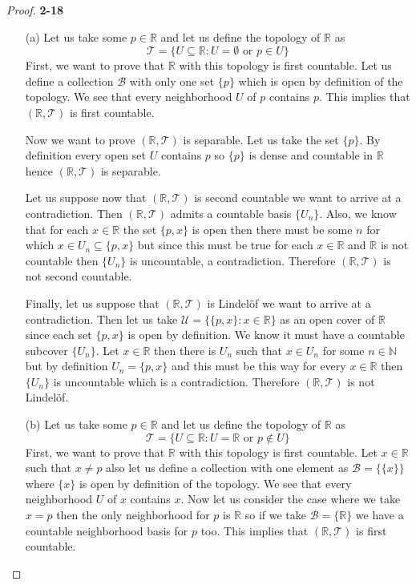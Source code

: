 \documentclass[11pt]{article}
\newcommand{\N}{\mathbb{N}}
\newcommand{\R}{\mathbb{R}}
\theoremstyle{definition}
\begin{document}
\cleardoublepage
\begin{proof}{\textbf{2-18}}
\begin{itemize}
    \item [(a)] Let us take some $p \in \R$ and let us define the topology of
    $\R$ as
    $$\mathcal{T} = \{U \subseteq \R: U= \emptyset \text{ or } p \in U\}$$
    First, we want to prove that $\R$ with this topology is first countable.
    Let us define a collection $\mathcal{B}$ with only one set $\{p\}$ which
    is open by definition of the topology. We see that every neighborhood $U$
    of $p$ contains $p$.
    This implies that $(\R, \mathcal{T})$ is first countable.

    Now we want to prove $(\R, \mathcal{T})$ is separable. Let us take the
    set $\{p\}$. By definition every open set $U$ contains $p$ so $\{p\}$ is
    dense and countable in $\R$ hence $(\R, \mathcal{T})$ is separable.

    Let us suppose now that $(\R, \mathcal{T})$ is second countable we want to
    arrive at a contradiction. Then $(\R, \mathcal{T})$ admits a countable
    basis $\{U_n\}$. Also, we know that for each $x \in \R$ the set $\{p,x\}$
    is open then there must be some $n$ for which $x \in U_n \subseteq \{p,x\}$
    but since this must be true for each $x \in \R$ and $\R$ is not countable
    then $\{U_n\}$ is uncountable, a contradiction.
    Therefore $(\R, \mathcal{T})$ is not second countable.

    Finally, let us suppose that $(\R, \mathcal{T})$ is Lindelöf we want to
    arrive at a contradiction. Then let us take 
    $\mathcal{U} = \{\{p,x\}: x \in \R\}$ as an open cover of $\R$ since each
    set $\{p,x\}$ is open by definition. We know it must have a countable
    subcover $\{U_n\}$. Let $x \in \R$ then there is $U_n$ such that
    $x \in U_n$ for some $n \in \N$ but by definition $U_n = \{p, x\}$
    and this must be this way for every $x \in \R$ then $\{U_n\}$
    is uncountable which is a contradiction.
    Therefore $(\R, \mathcal{T})$ is not Lindelöf.
    \cleardoublepage
    \item [(b)] Let us take some $p \in \R$ and let us define the topology of
    $\R$ as
    $$\mathcal{T} = \{U \subseteq \R: U= \R \text{ or } p \not\in U\}$$
    First, we want to prove that $\R$ with this topology is first countable.
    Let $x \in \R$ such that $x \neq p$ also let us define a collection with
    one element as $\mathcal{B} = \{\{x\}\}$ where $\{x\}$ is open by
    definition of the topology.
    We see that every neighborhood $U$ of $x$ contains $x$. 
    Now let us consider the case where we take $x = p$ then the only
    neighborhood for $p$ is $\R$ so if we take
    $\mathcal{B} = \{\R\}$ we have a countable neighborhood basis for $p$ too. 
    This implies that $(\R, \mathcal{T})$ is first countable.


\end{itemize}
\end{proof}
\end{document}
